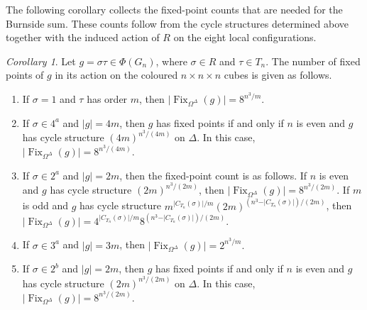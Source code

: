 \documentclass[12pt]{article}
\theoremstyle{definition}
\theoremstyle{remark}
\newtheorem{cor}[theorem]{Corollary}
\DeclareMathOperator{\Fix}{Fix}
\begin{document}
 
The following corollary collects the fixed-point counts that are needed for the Burnside sum. These counts follow from the cycle structures determined above together with the induced action of $R$ on the eight local configurations.
\begin{cor}\label{cor:fixed-point-counts}
Let $g=\sigma\tau\in \Phi(G_n)$, where $\sigma\in R$ and $\tau\in T_n$. The number of fixed points of $g$ in its action on the coloured $n\times n\times n$ cubes is given as follows.
\begin{enumerate}
\item\label{cor:fix-translations} If $\sigma=1$ and $\tau$ has order $m$, then
$
\vert \Fix_{\Omega^\Delta}(g)\vert =8^{n^3/m}.$
\item\label{cor:fix-4a} If $\sigma\in 4^a$ and $\vert g\vert =4m$, then $g$ has fixed points if and only if $n$ is even and $g$ has cycle structure
$(4m)^{n^3/(4m)}$
on $\Delta$. In this case,
$\vert \Fix_{\Omega^\Delta}(g)\vert =8^{n^3/(4m)}.$

\item\label{cor:fix-2a} If $\sigma\in 2^a$ and $\vert g\vert =2m$, then the fixed-point count is as follows. If $n$ is even and $g$ has cycle structure $(2m)^{n^3/(2m)}$, then
$\vert \Fix_{\Omega^\Delta}(g)\vert =8^{n^3/(2m)}.
$
If $m$ is odd and $g$ has cycle structure
$m^{\vert C_{T_n}(\sigma)\vert/m}(2m)^{(n^3-\vert C_{T_n}(\sigma)\vert)/(2m)}$, then
$\vert \Fix_{\Omega^\Delta}(g)\vert =
4^{\vert C_{T_n}(\sigma)\vert/m}8^{(n^3-\vert C_{T_n}(\sigma)\vert)/(2m)}.$

\item\label{cor:fix-3a} If $\sigma\in 3^a$ and $\vert g\vert =3m$, then
$\vert \Fix_{\Omega^\Delta}(g)\vert =2^{n^3/m}.$

\item\label{cor:fix-2b} If $\sigma\in 2^b$ and $\vert g\vert =2m$, then $g$ has fixed points if and only if $n$ is even and $g$ has cycle structure
$(2m)^{n^3/(2m)}
$
on $\Delta$. In this case,
$\vert \Fix_{\Omega^\Delta}(g)\vert =8^{n^3/(2m)}.$
\end{enumerate}
\end{cor}
\end{document}
